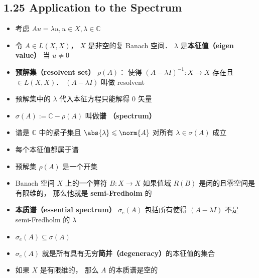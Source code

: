 \subsection{1.25 Application to the Spectrum}
\begin{itemize}
\item 考虑 $Au = \lambda u, u \in X, \lambda \in \mathbb C$

\item 令 $A\in L(X,X)$， $X$ 是非空的复 Banach 空间．  $\lambda$ 是\textbf{本征值（eigen value）} 当 $u\ne 0$

\item \textbf{预解集（resolvent set）} $\rho(A)$： 使得 $(A-\lambda I)^{-1}: X \to X$ 存在且 $\in L(X,X)$． $(A-\lambda I)$ 叫做 resolvent

\item 预解集中的 $\lambda$ 代入本征方程只能解得 0 矢量

\item $\sigma(A) := \mathbb C - \rho(A)$ 叫做\textbf{谱 （spectrum）}

\item 谱是 $\mathbb C$ 中的紧子集且 $\abs{\lambda} \leqslant \norm{A}$ 对所有 $\lambda\in\sigma(A)$ 成立

\item 每个本征值都属于谱

\item 预解集 $\rho(A)$ 是一个开集

\item Banach 空间 $X$ 上的一个算符 $B: X\to X$ 如果值域 $R(B)$ 是闭的且零空间是有限维的， 那么他就是 \textbf{semi-Fredholm} 的

\item \textbf{本质谱（essential spectrum）} $\sigma_e(A)$ 包括所有使得 $(A - \lambda I)$ 不是 semi-Fredholm 的 $\lambda$
\item $\sigma_e(A) \subseteq \sigma(A)$
\item $\sigma_e(A)$ 就是所有具有无穷\textbf{简并（degeneracy）}的本征值的集合
\item 如果 $X$ 是有限维的， 那么 $A$ 的本质谱是空的 
\end{itemize}

